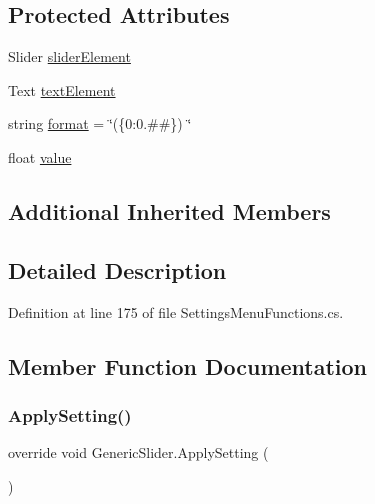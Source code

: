 \subsection*{Protected Attributes}
\begin{DoxyCompactItemize}
\item 
Slider \hyperlink{class_generic_slider_af8d3b973aab6f0228a47cf3bafac917c}{slider\+Element}
\item 
Text \hyperlink{class_generic_slider_ad5ee1ef7b937d77e0ba8609382adec38}{text\+Element}
\item 
string \hyperlink{class_generic_slider_a8ec4906d47d17525431e78118aee89a3}{format} = \char`\"{}(\{0\+:0.\#\#\}) \char`\"{}
\item 
float \hyperlink{class_generic_slider_a1e04e9fdf361b51869427a95d475159e}{value}
\end{DoxyCompactItemize}
\subsection*{Additional Inherited Members}


\subsection{Detailed Description}


Definition at line 175 of file Settings\+Menu\+Functions.\+cs.



\subsection{Member Function Documentation}
\mbox{\label{class_generic_slider_ae98915fdb0f94d37222e83e93f6ac814}} 
\subsubsection{\texorpdfstring{Apply\+Setting()}{ApplySetting()}}
{\footnotesize\ttfamily override void Generic\+Slider.\+Apply\+Setting (\begin{DoxyParamCaption}{ }\end{DoxyParamCaption})\hspace{0.3cm}{\ttfamily [virtual]}}



